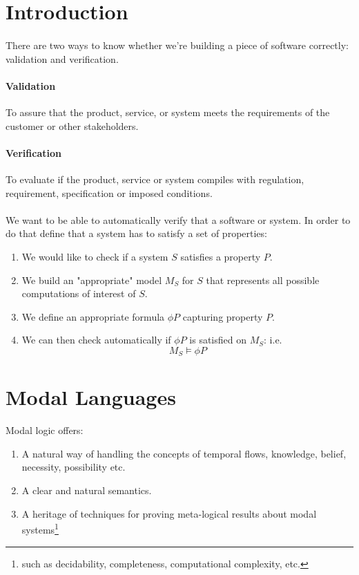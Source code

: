\documentclass{article}
\theoremstyle{plain}
\theoremstyle{definition}
\begin{document}
\begin{multicols}{2}
\section{Introduction}

\paragraph{} There are two ways to know whether we're building a piece of software correctly: validation and verification.

\paragraph{Validation} To assure that the product, service, or system meets the requirements of the customer or other stakeholders.
\paragraph{Verification} To evaluate if the product, service or system compiles with regulation, requirement, specification or imposed conditions.

\paragraph{} We want to be able to automatically verify that a software or system. In order to do that define that a system has to satisfy a set of properties:

\begin{enumerate}
\item We would like to check if a system $S$ satisfies a property $P$.
\item We build an "appropriate" model $M_S$ for $S$ that represents all possible computations of interest of $S$.
\item We define an appropriate formula $\phi P$ capturing property $P$.
\item We can then check automatically if $\phi P$ is satisfied on $M_S$: i.e. $$M_S \models \phi P$$
\end{enumerate}

\section{Modal Languages}

\paragraph{} Modal logic offers:
\begin{enumerate}
\item A natural way of handling the concepts of temporal flows, knowledge, belief, necessity, possibility etc.
\item A clear and natural semantics.
\item A heritage of techniques for proving meta-logical results about modal systems\footnote{such as decidability, completeness, computational complexity, etc.}
\end{enumerate}


\end{multicols}
\end{document}
